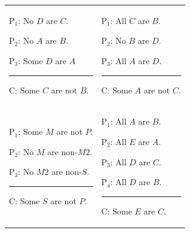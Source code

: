 \begin{exercises}
\begin{longtabu}{X[1,p,m]X[1,p,m]} 
\item \begin{earg}
\item[P$_1$:] No $D$ are $C$.
\item[P$_2$:] No $A$ are $B$. 
\item[P$_3$:] Some $D$ are $A$ %
\vspace{-.5em}
\item [] \rule{0.4\linewidth}{.5pt} 
\item[C:] Some $C$ are not $B$.
\end{earg} 


& 
\item \begin{earg}
\item[P$_1$:] All $C$ are $B$.
\item[P$_2$:] No $B$ are $D$. %
\item[P$_3$:] All $A$ are $D$.
\vspace{-.5em}
\item [] \rule{0.4\linewidth}{.5pt} 
\item[C:] Some $A$ are not $C$.
\end{earg} 


\\
\item \begin{earg}
\item[P$_1$:] Some $M$ are not $P$.
\item[P$_2$:] No $M$ are non-$M2$. %
\item[P$_3$:] No $M2$ are non-$S$.
\vspace{-.5em}
\item [] \rule{0.4\linewidth}{.5pt} 
\item[C:] Some $S$ are not $P$.
\end{earg} 


&
\item \begin{earg}
\item[P$_1$:] All $A$ are $B$. %
\item[P$_2$:] All $E$ are $A$.
\item[P$_3$:] All $D$ are $C$.
\item[P$_4$:] All $D$ are $B$. %
\vspace{-.5em}
\item [] \rule{0.4\linewidth}{.5pt} 
\item[C:] Some $E$ are $C$.
\end{earg} 


\end{longtabu}
\end{exercises}
